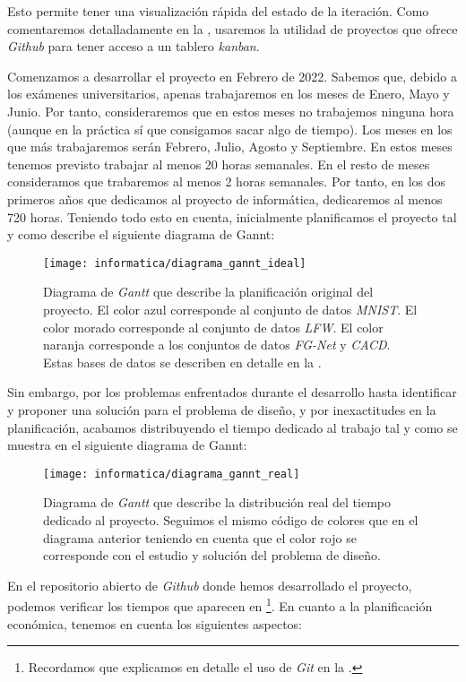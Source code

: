 Esto permite tener una visualización rápida del estado de la iteración. Como comentaremos detalladamente en la , usaremos la utilidad de proyectos que ofrece \textit{Github} para tener acceso a un tablero \textit{kanban}.

Comenzamos a desarrollar el proyecto en Febrero de 2022. Sabemos que, debido a los exámenes universitarios, apenas trabajaremos en los meses de Enero, Mayo y Junio. Por tanto, consideraremos que en estos meses no trabajemos ninguna hora (aunque en la práctica sí que consigamos sacar algo de tiempo). Los meses en los que más trabajaremos serán Febrero, Julio, Agosto y Septiembre. En estos meses tenemos previsto trabajar al menos 20 horas semanales. En el resto de meses consideramos que trabaremos al menos 2 horas semanales. Por tanto, en los dos primeros años que dedicamos al proyecto de informática, dedicaremos al menos 720 horas. Teniendo todo esto en cuenta, inicialmente planificamos el proyecto tal y como describe el siguiente diagrama de Gannt:

\begin{figure}[H]
	\centering
	\texttt{[image: informatica/diagrama\_gannt\_ideal]}
	\caption{Diagrama de \textit{Gantt} que describe la planificación original del proyecto. El color azul corresponde al conjunto de datos \textit{MNIST}. El color morado corresponde al conjunto de datos \textit{LFW}. El color naranja corresponde a los conjuntos de datos \textit{FG-Net} y \textit{CACD}. Estas bases de datos se describen en detalle en la .}
\end{figure}

Sin embargo, por los problemas enfrentados durante el desarrollo hasta identificar y proponer una solución para el problema de diseño, y por inexactitudes en la planificación, acabamos distribuyendo el tiempo dedicado al trabajo tal y como se muestra en el siguiente diagrama de Gannt:

\begin{figure}[H]
	\centering
	\texttt{[image: informatica/diagrama\_gannt\_real]}
	\caption{Diagrama de \textit{Gantt} que describe la distribución real del tiempo dedicado al proyecto. Seguimos el mismo código de colores que en el diagrama anterior teniendo en cuenta que el color rojo se corresponde con el estudio y solución del problema de diseño.}
	\label{img:gannt_real}
\end{figure}

En el repositorio abierto de \textit{Github} \cite{informatica:repogithub} donde hemos desarrollado el proyecto, podemos verificar los tiempos que aparecen en  \footnote{Recordamos que explicamos en detalle el uso de \textit{Git} en la .}. En cuanto a la planificación económica, tenemos en cuenta los siguientes aspectos:

